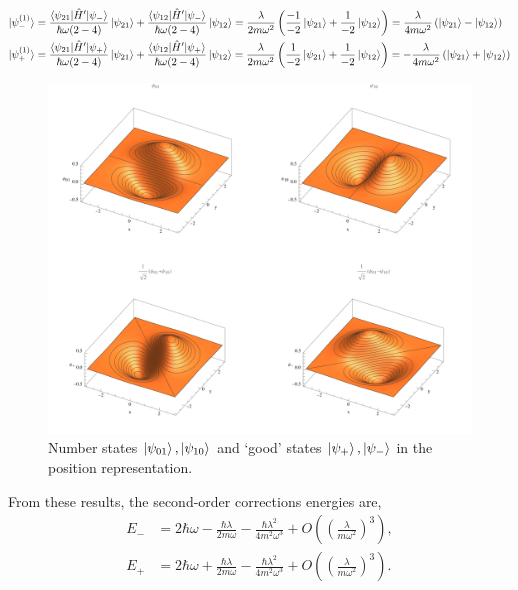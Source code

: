 \documentclass[10pt]{article}
\newcommand{\1}{\mathbf 1}
\begin{document}
\begin{align}
	\ket{\psi_-^{(1)}}
	&=
	\frac{\braket{\psi_{21} |\hat H' | \psi_{-} }}{\hbar \omega(2-4)}
	\ket{\psi_{21}}
	+
	\frac{\braket{\psi_{12} |\hat H' | \psi_{-} }}{\hbar \omega(2-4)}
	\ket{\psi_{12}}
	=
	\frac{\lambda}{2 m \omega^2}
	\left(
		\frac{-1}{-2}
		\ket{\psi_{21}}
		+
		\frac{1}{-2}
		\ket{\psi_{12}}
	\right)
	=
	\frac{\lambda}{4 m \omega^2}
	\left(
		\ket{\psi_{21}}
		-
		\ket{\psi_{12}}
	\right)\\
	\ket{\psi_+^{(1)}}
	&=
	\frac{\braket{\psi_{21} |\hat H' | \psi_{+} }}{\hbar \omega(2-4)}
	\ket{\psi_{21}}
	+
	\frac{\braket{\psi_{12} |\hat H' | \psi_{+} }}{\hbar \omega(2-4)}
	\ket{\psi_{12}}
	=
	\frac{\lambda}{2 m \omega^2}
	\left(
		\frac{1}{-2}
		\ket{\psi_{21}}
		+
		\frac{1}{-2}
		\ket{\psi_{12}}
	\right)
	=
	-
	\frac{\lambda}{4 m \omega^2}
	\left(
		\ket{\psi_{21}}
		+
		\ket{\psi_{12}}
	\right)
\end{align}
\begin{figure}
\centering
\includegraphics[width=\linewidth]{fig/grid.png}
\caption{Number states $\ket{\psi_{01}},\ket{\psi_{10}}$ and `good' states $\ket{\psi_{+}},\ket{\psi_{-}}$ in the position representation.
\label{visualizingGoodStates}
}
\end{figure}
From these results, the second-order corrections energies are,
\begin{align}
	E_- 
	&=
	2 \hbar \omega
	-
	\frac{\hbar \lambda}{2 m \omega}
	-
	\frac{\hbar \lambda^2}{4 m^2 \omega^3}
	+
	O((\tfrac{\lambda}{m \omega^2})^3),
	\\
	E_+
	&=
	2 \hbar \omega
	+
	\frac{\hbar \lambda}{2 m \omega}
	-
	\frac{\hbar \lambda^2}{4 m^2 \omega^3}
	+
	O((\tfrac{\lambda}{m \omega^2})^3).
\end{align}
\end{document}

